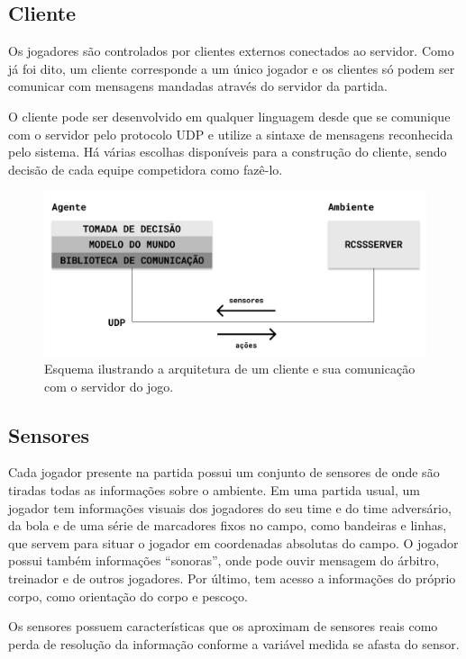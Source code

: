 \subsection{Cliente}
\par Os jogadores são controlados por clientes externos conectados ao servidor. Como já foi dito, um cliente corresponde a um único jogador e os clientes só podem ser comunicar com mensagens mandadas através do servidor da partida.
\par O cliente pode ser desenvolvido em qualquer linguagem desde que se comunique com o servidor pelo protocolo UDP e utilize a sintaxe de mensagens reconhecida pelo sistema. Há várias escolhas disponíveis para a construção do cliente, sendo decisão de cada equipe competidora como fazê-lo.

\begin{figure}[H]
	\includegraphics[width=0.9\linewidth]{figs/system.png}
	\centering
	\caption{Esquema ilustrando a arquitetura de um cliente e sua comunicação com o servidor do jogo.}
	\label{fig:system}
\end{figure}

\subsection{Sensores}
\par Cada jogador presente na partida possui um conjunto de sensores de onde são tiradas todas as informações sobre o ambiente. Em uma partida usual, um jogador tem informações visuais dos jogadores do seu time e do time adversário, da bola e de uma série de marcadores fixos no campo, como bandeiras e linhas, que servem para situar o jogador em coordenadas absolutas do campo. O jogador possui também informações ``sonoras'', onde pode ouvir mensagem do árbitro, treinador e de outros jogadores. Por último, tem acesso a informações do próprio corpo, como orientação do corpo e pescoço. \cite{rcssmanual2003}
\par Os sensores possuem características que os aproximam de sensores reais como perda de resolução da informação conforme a variável medida se afasta do sensor.


